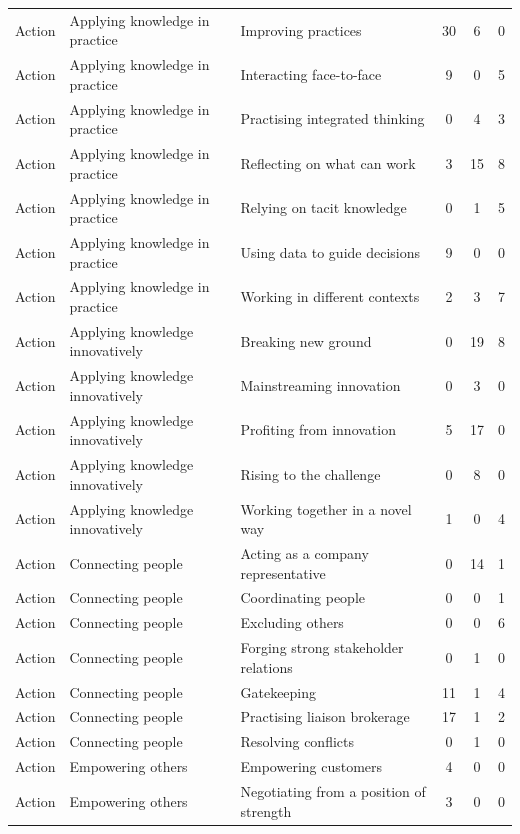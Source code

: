 \begin{landscape}
\begin{longtable}[c]{lllccc}
Action & Applying knowledge in practice & Improving practices &  30 &   6 &   0 \\ 
Action & Applying knowledge in practice & Interacting face-to-face &   9 &   0 &   5 \\ 
Action & Applying knowledge in practice & Practising integrated thinking &   0 &   4 &   3 \\ 
Action & Applying knowledge in practice & Reflecting on what can work &   3 &  15 &   8 \\ 
Action & Applying knowledge in practice & Relying on tacit knowledge &   0 &   1 &   5 \\ 
Action & Applying knowledge in practice & Using data to guide decisions &   9 &   0 &   0 \\ 
Action & Applying knowledge in practice & Working in different contexts &   2 &   3 &   7 \\ 
Action & Applying knowledge innovatively & Breaking new ground &   0 &  19 &   8 \\ 
Action & Applying knowledge innovatively & Mainstreaming innovation &   0 &   3 &   0 \\ 
Action & Applying knowledge innovatively & Profiting from innovation &   5 &  17 &   0 \\ 
Action & Applying knowledge innovatively & Rising to the challenge &   0 &   8 &   0 \\ 
Action & Applying knowledge innovatively & Working together in a novel way &   1 &   0 &   4 \\ 
Action & Connecting people & Acting as a company representative &   0 &  14 &   1 \\ 
Action & Connecting people & Coordinating people &   0 &   0 &   1 \\ 
Action & Connecting people & Excluding others &   0 &   0 &   6 \\ 
Action & Connecting people & Forging strong stakeholder relations &   0 &   1 &   0 \\ 
Action & Connecting people & Gatekeeping &  11 &   1 &   4 \\ 
Action & Connecting people & Practising liaison brokerage &  17 &   1 &   2 \\ 
Action & Connecting people & Resolving conflicts &   0 &   1 &   0 \\ 
Action & Empowering others & Empowering customers &   4 &   0 &   0 \\ 
Action & Empowering others & Negotiating from a position of strength &   3 &   0 &   0 \\ 

\end{longtable}
\end{landscape}
